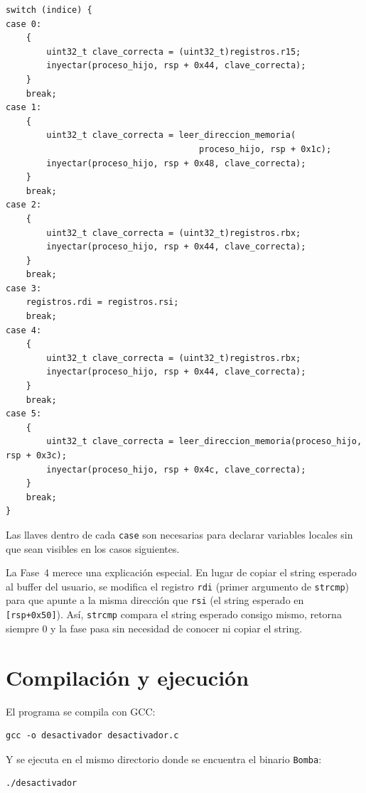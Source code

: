 \documentclass[10pt,a4paper]{article}
\begin{document}
\begin{lstlisting}[style=cstyle, caption={Switch de inyeccion por fase}]
switch (indice) {
case 0:
    {
        uint32_t clave_correcta = (uint32_t)registros.r15;
        inyectar(proceso_hijo, rsp + 0x44, clave_correcta);
    }
    break;
case 1:
    {
        uint32_t clave_correcta = leer_direccion_memoria(
                                      proceso_hijo, rsp + 0x1c);
        inyectar(proceso_hijo, rsp + 0x48, clave_correcta);
    }
    break;
case 2:
    {
        uint32_t clave_correcta = (uint32_t)registros.rbx;
        inyectar(proceso_hijo, rsp + 0x44, clave_correcta);
    }
    break;
case 3:
    registros.rdi = registros.rsi;
    break;
case 4:
    {
        uint32_t clave_correcta = (uint32_t)registros.rbx;
        inyectar(proceso_hijo, rsp + 0x44, clave_correcta);
    }
    break;
case 5:
    {
        uint32_t clave_correcta = leer_direccion_memoria(proceso_hijo, rsp + 0x3c);
        inyectar(proceso_hijo, rsp + 0x4c, clave_correcta);
    }
    break;
}
\end{lstlisting}

Las llaves dentro de cada \texttt{case} son necesarias para declarar variables locales sin que sean visibles en los casos siguientes.

La Fase~4 merece una explicación especial. En lugar de copiar el string esperado al buffer del usuario, se modifica el registro \texttt{rdi} (primer argumento de \texttt{strcmp}) para que apunte a la misma dirección que \texttt{rsi} (el string esperado en \texttt{[rsp+0x50]}). Así, \texttt{strcmp} compara el string esperado consigo mismo, retorna siempre 0 y la fase pasa sin necesidad de conocer ni copiar el string.

\section{Compilación y ejecución}

El programa se compila con GCC:

\begin{lstlisting}[style=termstyle]
gcc -o desactivador desactivador.c
\end{lstlisting}

Y se ejecuta en el mismo directorio donde se encuentra el binario \texttt{Bomba}:

\begin{lstlisting}[style=termstyle]
./desactivador
\end{lstlisting}
\end{document}
